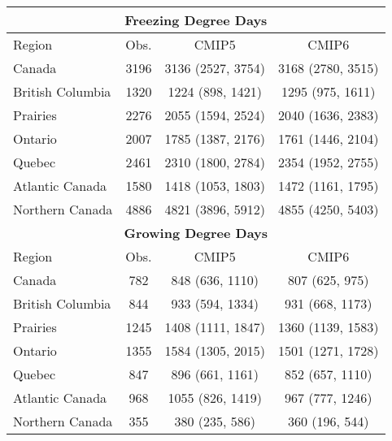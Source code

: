 \documentclass[]{scrartcl}
\begin{document}
\begin{appendices}
\begin{table}[t]
\begin{center}
\begin{tabular}{|l|ccc|}
			\hline	
			\multicolumn{4}{|c|}{\textbf{Freezing Degree Days}} \\
			\hline
			Region & Obs. & CMIP5 & CMIP6   \\
			\hline
			Canada & 3196 & 3136 (2527, 3754) & 3168 (2780, 3515) \\ 
			British Columbia & 1320 & 1224 (898, 1421) & 1295 (975, 1611) \\ 
			Prairies & 2276 & 2055 (1594, 2524) & 2040 (1636, 2383) \\ 
			Ontario & 2007 & 1785 (1387, 2176) & 1761 (1446, 2104) \\ 
			Quebec & 2461 & 2310 (1800, 2784) & 2354 (1952, 2755) \\ 
			Atlantic Canada & 1580 & 1418 (1053, 1803) & 1472 (1161, 1795) \\ 
			Northern Canada & 4886 & 4821 (3896, 5912) & 4855 (4250, 5403) \\ 
			\hline	
			\multicolumn{4}{|c|}{\textbf{Growing Degree Days}} \\
			\hline
			Region & Obs. & CMIP5 & CMIP6   \\
			\hline
			Canada & 782 & 848 (636, 1110) & 807 (625, 975) \\ 
			British Columbia & 844 & 933 (594, 1334) & 931 (668, 1173) \\ 
			Prairies & 1245 & 1408 (1111, 1847) & 1360 (1139, 1583) \\ 
			Ontario & 1355 & 1584 (1305, 2015) & 1501 (1271, 1728) \\ 
			Quebec & 847 & 896 (661, 1161) & 852 (657, 1110) \\ 
			Atlantic Canada & 968 & 1055 (826, 1419) & 967 (777, 1246) \\ 
			Northern Canada & 355 & 380 (235, 586) & 360 (196, 544) \\ 
			\hline	
		\end{tabular}
	\end{center}
\end{table}


\end{appendices}
\end{document}
